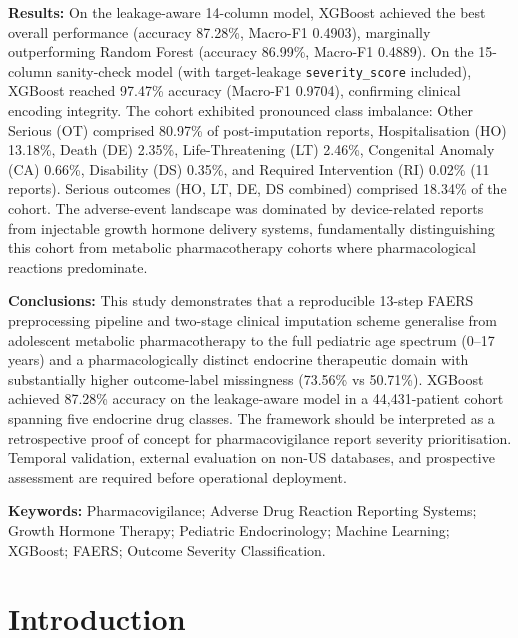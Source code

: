 \documentclass[10pt,twocolumn]{article}
\newcommand{\FAERS}{\textsf{FAERS}\xspace}
\begin{document}
\begin{tcolorbox}[absbox, title={Structured Abstract}, colbacktitle=jpbiBlue!8, coltitle=jpbiBlue, fonttitle=\small\bfseries\centering\MakeUppercase, toptitle=2pt, bottomtitle=2pt, top=1.5pt, bottom=1.5pt]
\par\vspace{1.5pt}\noindent\textbf{Results:}
On the leakage-aware 14-column model, XGBoost achieved the best overall performance (accuracy 87.28\%, Macro-F1 0.4903), marginally outperforming Random Forest (accuracy 86.99\%, Macro-F1 0.4889). On the 15-column sanity-check model (with target-leakage \texttt{severity\_score} included), XGBoost reached 97.47\% accuracy (Macro-F1 0.9704), confirming clinical encoding integrity. The cohort exhibited pronounced class imbalance: Other Serious (OT) comprised 80.97\% of post-imputation reports, Hospitalisation (HO) 13.18\%, Death (DE) 2.35\%, Life-Threatening (LT) 2.46\%, Congenital Anomaly (CA) 0.66\%, Disability (DS) 0.35\%, and Required Intervention (RI) 0.02\% (11 reports). Serious outcomes (HO, LT, DE, DS combined) comprised 18.34\% of the cohort. The adverse-event landscape was dominated by device-related reports from injectable growth hormone delivery systems, fundamentally distinguishing this cohort from metabolic pharmacotherapy cohorts where pharmacological reactions predominate.
 
\par\vspace{1.5pt}\noindent\textbf{Conclusions:}
This study demonstrates that a reproducible 13-step \FAERS preprocessing pipeline and two-stage clinical imputation scheme generalise from adolescent metabolic pharmacotherapy to the full pediatric age spectrum (0--17 years) and a pharmacologically distinct endocrine therapeutic domain with substantially higher outcome-label missingness (73.56\% vs 50.71\%). XGBoost achieved 87.28\% accuracy on the leakage-aware model in a 44{,}431-patient cohort spanning five endocrine drug classes. The framework should be interpreted as a retrospective proof of concept for pharmacovigilance report severity prioritisation. Temporal validation, external evaluation on non-US databases, and prospective assessment are required before operational deployment.
 
\par\vspace{1.5pt}\noindent\textbf{Keywords:}
Pharmacovigilance; Adverse Drug Reaction Reporting Systems; Growth Hormone Therapy; Pediatric Endocrinology; Machine Learning; XGBoost; FAERS; Outcome Severity Classification.
\end{tcolorbox}
\twocolumn
 
\section{Introduction}
 
\end{document}
